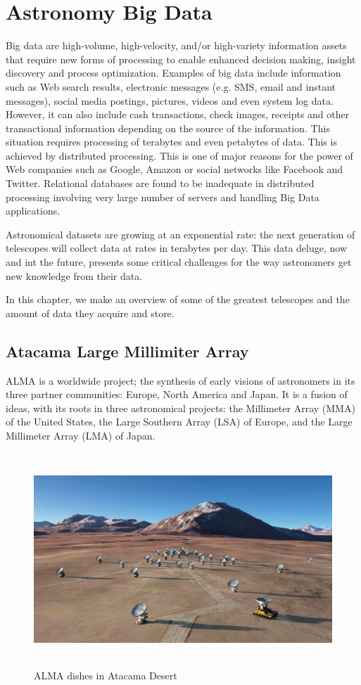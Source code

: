 \chapter{Astronomy Big Data}\label{theproblem}


Big data are high-volume, high-velocity, and/or high-variety information assets that require new forms of processing to enable enhanced decision making, insight discovery and process optimization. Examples of big data include information such as Web search results, electronic messages (e.g. SMS, email and instant messages), social media postings, pictures, videos and even system log data. However, it can also include cash transactions, check images, receipts and other transactional information depending on the source of the information. This situation requires processing of terabytes and even petabytes of data. This is achieved by distributed processing. This is one of major reasons for the power of Web companies such as
Google, Amazon or social networks like Facebook and Twitter. Relational databases are found to be inadequate in distributed processing involving very large number of servers and handling Big Data applications.

Astronomical datasets are growing at an exponential rate: the next generation of telescopes will collect data at rates in terabytes per day. This data deluge, now and int the future, presents some critical challenges for the way astronomers get new knowledge from their data.

In this chapter, we make an overview of some of the greatest telescopes and the amount of data they acquire and store.


\section{Atacama Large Millimiter Array}

ALMA is a worldwide project; the synthesis of early visions of astronomers in its three partner communities: Europe, North America and Japan. It is a fusion of ideas, with its roots in three astronomical projects: the Millimeter Array (MMA) of the United States, the Large Southern Array (LSA) of Europe, and the Large Millimeter Array (LMA) of Japan.

 \begin{figure}[H]
 \centering
 \includegraphics[height=8cm]{images/alma.jpg}
 \caption{ALMA dishes in Atacama Desert}
 \end{figure}


